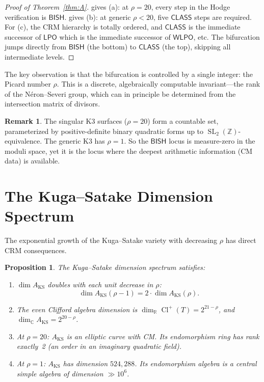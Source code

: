 \documentclass[11pt,a4paper]{article}
\theoremstyle{plain}
\newtheorem{proposition}[theorem]{Proposition}
\theoremstyle{definition}
\newtheorem{remark}[theorem]{Remark}
\newcommand{\BISH}{\textsf{BISH}}
\newcommand{\WLPO}{\textsf{WLPO}}
\newcommand{\LPO}{\textsf{LPO}}
\newcommand{\CLASS}{\textsf{CLASS}}
\newcommand{\Z}{\mathbb{Z}}
\newcommand{\R}{\mathbb{R}}
\newcommand{\C}{\mathbb{C}}
\DeclareMathOperator{\Cl}{Cl}
\DeclareMathOperator{\SL}{SL}
\begin{document}
\begin{proof}[Proof of Theorem~\ref{thm:A}]
 gives (a): at $\rho = 20$, every step in the Hodge verification is $\BISH$.  gives (b): at generic $\rho < 20$, five $\CLASS$ steps are required. For (c), the CRM hierarchy is totally ordered, and $\CLASS$ is the immediate successor of $\LPO$ which is the immediate successor of $\WLPO$, etc. The bifurcation jumps directly from $\BISH$ (the bottom) to $\CLASS$ (the top), skipping all intermediate levels.
\end{proof}

The key observation is that the bifurcation is controlled by a single integer: the Picard number $\rho$. This is a discrete, algebraically computable invariant---the rank of the N\'eron--Severi group, which can in principle be determined from the intersection matrix of divisors.

\begin{remark}
The singular K3 surfaces ($\rho = 20$) form a countable set, parameterized by positive-definite binary quadratic forms up to $\SL_2(\Z)$-equivalence. The generic K3 has $\rho = 1$. So the $\BISH$ locus is measure-zero in the moduli space, yet it is the locus where the deepest arithmetic information (CM data) is available.
\end{remark}


\section{The Kuga--Satake Dimension Spectrum}\label{sec:ks-spectrum}

The exponential growth of the Kuga--Satake variety with decreasing $\rho$ has direct CRM consequences.

\begin{proposition}\label{prop:ks-spectrum}
The Kuga--Satake dimension spectrum satisfies:
\begin{enumerate}[label=(\alph*)]
  \item $\dim A_{\mathrm{KS}}$ doubles with each unit decrease in $\rho$:
  \[
    \dim A_{\mathrm{KS}}(\rho - 1) = 2 \cdot \dim A_{\mathrm{KS}}(\rho).
  \]
  \item The even Clifford algebra dimension is $\dim_\R \Cl^+(T) = 2^{21-\rho}$, and $\dim_\C A_{\mathrm{KS}} = 2^{20-\rho}$.
  \item At $\rho = 20$: $A_{\mathrm{KS}}$ is an elliptic curve with CM. Its endomorphism ring has rank exactly~2 (an order in an imaginary quadratic field).
  \item At $\rho = 1$: $A_{\mathrm{KS}}$ has dimension $524{,}288$. Its endomorphism algebra is a central simple algebra of dimension $\gg 10^6$.
\end{enumerate}
\end{proposition}
\end{document}
